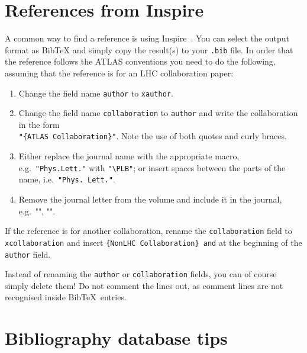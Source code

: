 \documentclass[UKenglish,texlive=2013]{latex/atlasdoc}
\newcommand*{\BibTeX}{Bib\TeX}
\newcommand{\File}[1]{\texttt{#1}\xspace}
\begin{document}
\section{References from Inspire}
\label{sc:inquire}

A common way to find a reference is using Inspire~\cite{inspire}.
You can select the output format as BibTeX and simply copy the result(s) to your \File{.bib} file.
In order that the reference follows the ATLAS conventions you need to do the following,
assuming that the reference is for an LHC collaboration paper:
\begin{enumerate}
\item Change the field name \texttt{author} to \texttt{xauthor}.
\item Change the field name \texttt{collaboration} to \texttt{author} and write the collaboration in the form\\
  \verb|"{ATLAS Collaboration}"|. Note the use of both quotes and curly braces.
\item Either replace the journal name with the appropriate macro, e.g.\ \verb|"Phys.Lett."| with
  \verb|"\PLB"|; or insert spaces between the parts of the name, i.e.\ \verb|"Phys. Lett."|.
\item Remove the journal letter from the volume and include it in the journal,
  e.g.\ "\EPJC", "\PRD". 
\end{enumerate}
If the reference is for another collaboration, rename the \texttt{collaboration} field to
\texttt{xcollaboration} and insert \verb|{NonLHC Collaboration} and| at the beginning of the 
\texttt{author} field.

Instead of renaming the \texttt{author} or \texttt{collaboration} fields, you can of course simply delete them!
Do not comment the lines out, as comment lines are not recognised inside \BibTeX\ entries.


\section{Bibliography database tips}
\end{document}
